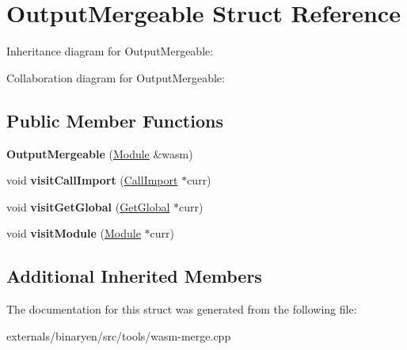 \hypertarget{struct_output_mergeable}{}\section{Output\+Mergeable Struct Reference}
\label{struct_output_mergeable}


Inheritance diagram for Output\+Mergeable\+:


Collaboration diagram for Output\+Mergeable\+:
\subsection*{Public Member Functions}
\begin{DoxyCompactItemize}
\item 
\mbox{\label{struct_output_mergeable_a9a5d4fea1798f665061358d0558f7a14}} 
{\bfseries Output\+Mergeable} (\mbox{\hyperlink{classwasm_1_1_module}{Module}} \&wasm)
\item 
\mbox{\label{struct_output_mergeable_abea9d245d4fac243ae752d20bc0bd7b2}} 
void {\bfseries visit\+Call\+Import} (\mbox{\hyperlink{classwasm_1_1_call_import}{Call\+Import}} $\ast$curr)
\item 
\mbox{\label{struct_output_mergeable_a69378a2b557775077f8d10bd3127aae5}} 
void {\bfseries visit\+Get\+Global} (\mbox{\hyperlink{classwasm_1_1_get_global}{Get\+Global}} $\ast$curr)
\item 
\mbox{\label{struct_output_mergeable_a92f1b088761c69ed613f2a764d77e738}} 
void {\bfseries visit\+Module} (\mbox{\hyperlink{classwasm_1_1_module}{Module}} $\ast$curr)
\end{DoxyCompactItemize}
\subsection*{Additional Inherited Members}


The documentation for this struct was generated from the following file\+:\begin{DoxyCompactItemize}
\item 
externals/binaryen/src/tools/wasm-\/merge.\+cpp\end{DoxyCompactItemize}
